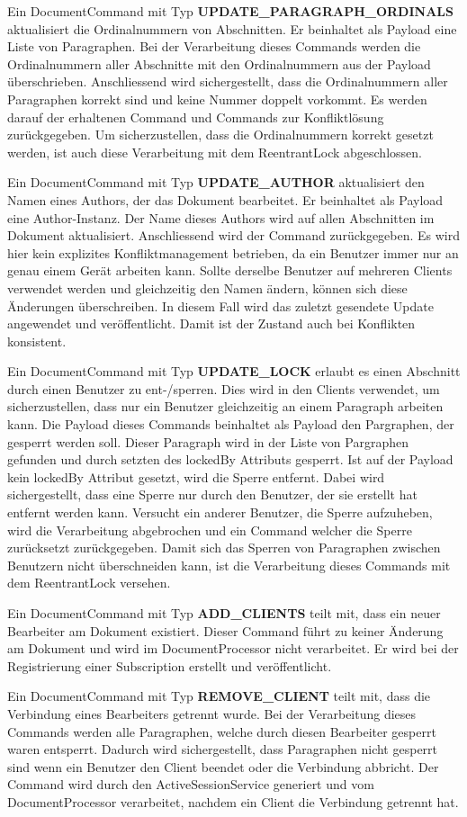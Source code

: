 Ein DocumentCommand mit Typ \textbf{UPDATE\_PARAGRAPH\_ORDINALS} aktualisiert die Ordinalnummern von Abschnitten.
Er beinhaltet als Payload eine Liste von Paragraphen.
Bei der Verarbeitung dieses Commands werden die Ordinalnummern aller Abschnitte mit den Ordinalnummern aus der Payload überschrieben.
Anschliessend wird sichergestellt, dass die Ordinalnummern aller Paragraphen korrekt sind und keine Nummer doppelt vorkommt.
Es werden darauf der erhaltenen Command und Commands zur Konfliktlösung zurückgegeben.
Um sicherzustellen, dass die Ordinalnummern korrekt gesetzt werden, ist auch diese Verarbeitung mit dem ReentrantLock abgeschlossen.

Ein DocumentCommand mit Typ \textbf{UPDATE\_AUTHOR} aktualisiert den Namen eines Authors, der das Dokument bearbeitet.
Er beinhaltet als Payload eine Author-Instanz.
Der Name dieses Authors wird auf allen Abschnitten im Dokument aktualisiert.
Anschliessend wird der Command zurückgegeben.
Es wird hier kein explizites Konfliktmanagement betrieben, da ein Benutzer immer nur an genau einem Gerät arbeiten kann.
Sollte derselbe Benutzer auf mehreren Clients verwendet werden und gleichzeitig den Namen ändern, können sich diese Änderungen überschreiben.
In diesem Fall wird das zuletzt gesendete Update angewendet und veröffentlicht.
Damit ist der Zustand auch bei Konflikten konsistent.

Ein DocumentCommand mit Typ \textbf{UPDATE\_LOCK} erlaubt es einen Abschnitt durch einen Benutzer zu ent-/sperren.
Dies wird in den Clients verwendet, um sicherzustellen, dass nur ein Benutzer gleichzeitig an einem Paragraph arbeiten kann.
Die Payload dieses Commands beinhaltet als Payload den Pargraphen, der gesperrt werden soll.
Dieser Paragraph wird in der Liste von Pargraphen gefunden und durch setzten des lockedBy Attributs gesperrt.
Ist auf der Payload kein lockedBy Attribut gesetzt, wird die Sperre entfernt.
Dabei wird sichergestellt, dass eine Sperre nur durch den Benutzer, der sie erstellt hat entfernt werden kann.
Versucht ein anderer Benutzer, die Sperre aufzuheben, wird die Verarbeitung abgebrochen und ein Command welcher die Sperre zurücksetzt zurückgegeben.
Damit sich das Sperren von Paragraphen zwischen Benutzern nicht überschneiden kann, ist die Verarbeitung dieses Commands mit dem ReentrantLock versehen. 

Ein DocumentCommand mit Typ \textbf{ADD\_CLIENTS} teilt mit, dass ein neuer Bearbeiter am Dokument existiert.
Dieser Command führt zu keiner Änderung am Dokument und wird im DocumentProcessor nicht verarbeitet.
Er wird bei der Registrierung einer Subscription erstellt und veröffentlicht.

Ein DocumentCommand mit Typ \textbf{REMOVE\_CLIENT} teilt mit, dass die Verbindung eines Bearbeiters getrennt wurde.
Bei der Verarbeitung dieses Commands werden alle Paragraphen, welche durch diesen Bearbeiter gesperrt waren entsperrt.
Dadurch wird sichergestellt, dass Paragraphen nicht gesperrt sind wenn ein Benutzer den Client beendet oder die Verbindung abbricht.
Der Command wird durch den ActiveSessionService generiert und vom DocumentProcessor verarbeitet, nachdem ein Client die Verbindung getrennt hat.

\clearpage
